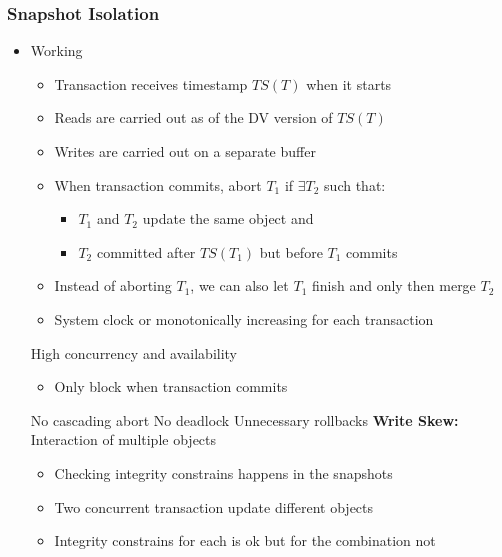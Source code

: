\subsubsection{Snapshot Isolation}
\begin{itemize}
     Assume that transaction are serializable and revert if they are not
    \item Working
        \begin{itemize}
            \item Transaction receives timestamp $TS(T)$ when it starts
            \item Reads are carried out as of the DV version of $TS(T)$
            \item Writes are carried out on a separate buffer
            \item When transaction commits, abort $T_1$ if $\exists T_2$ such that:
                \begin{itemize}
                    \item $T_1$ and $T_2$ update the same object and
                    \item $T_2$ committed after $TS(T_1)$ but before $T_1$ commits
                \end{itemize}
            \item Instead of aborting $T_1$, we can also let $T_1$ finish and only then merge $T_2$
        \end{itemize}
        \begin{itemize}
            \item System clock or monotonically increasing for each transaction
        \end{itemize}
    \ipro High concurrency and availability
        \begin{itemize}
            \item Only block when transaction commits
        \end{itemize}
    \ipro No cascading abort
    \ipro No deadlock
    \icon Unnecessary rollbacks
    \icon \textbf{Write Skew:} Interaction of multiple objects
        \begin{itemize}
            \item Checking integrity constrains happens in the snapshots
            \item Two concurrent transaction update different objects
            \item Integrity constrains for each is ok but for the combination not
        \end{itemize}

\end{itemize}
